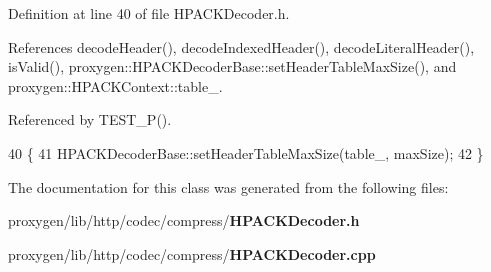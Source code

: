 Definition at line 40 of file H\+P\+A\+C\+K\+Decoder.\+h.



References decode\+Header(), decode\+Indexed\+Header(), decode\+Literal\+Header(), is\+Valid(), proxygen\+::\+H\+P\+A\+C\+K\+Decoder\+Base\+::set\+Header\+Table\+Max\+Size(), and proxygen\+::\+H\+P\+A\+C\+K\+Context\+::table\+\_\+.



Referenced by T\+E\+S\+T\+\_\+\+P().


\begin{DoxyCode}
40                                                \{
41     HPACKDecoderBase::setHeaderTableMaxSize(table_, maxSize);
42   \}
\end{DoxyCode}


The documentation for this class was generated from the following files\+:\begin{DoxyCompactItemize}
\item 
proxygen/lib/http/codec/compress/{\bf H\+P\+A\+C\+K\+Decoder.\+h}\item 
proxygen/lib/http/codec/compress/{\bf H\+P\+A\+C\+K\+Decoder.\+cpp}\end{DoxyCompactItemize}
